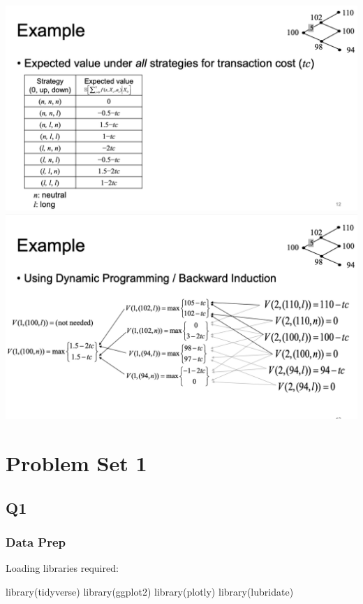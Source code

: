 \documentclass[
  oneside]{book}
\newenvironment{Shaded}{\begin{snugshade}}{\end{snugshade}}
\newcommand{\FunctionTok}[1]{\textcolor[rgb]{0.00,0.00,0.00}{#1}}
\newcommand{\NormalTok}[1]{#1}
\begin{document}
\includegraphics{Notes/Obsidian-Attachments/13-Optimization-in-Finance-4.png}
\includegraphics{Notes/Obsidian-Attachments/13-Optimization-in-Finance-5.png}

\hypertarget{problem-set-1}{%
\chapter{Problem Set 1}\label{problem-set-1}}

\hypertarget{q1}{%
\section{Q1}\label{q1}}

\hypertarget{data-prep}{%
\subsection{Data Prep}\label{data-prep}}

Loading libraries required:

\begin{Shaded}
\begin{Highlighting}[]
\FunctionTok{library}\NormalTok{(tidyverse)}
\FunctionTok{library}\NormalTok{(ggplot2)}
\FunctionTok{library}\NormalTok{(plotly)}
\FunctionTok{library}\NormalTok{(lubridate)}
\end{Highlighting}
\end{Shaded}
\end{document}
